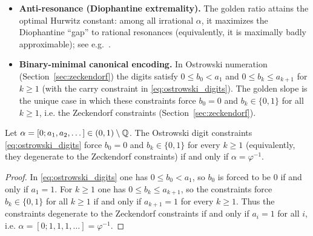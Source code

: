 \begin{itemize}
    \item \textbf{Anti-resonance (Diophantine extremality).} The golden ratio attains the optimal Hurwitz constant: among all irrational $\alpha$, it maximizes the Diophantine ``gap'' to rational resonances (equivalently, it is maximally badly approximable); see e.g.~\cite{Cassels1957,KuipersNiederreiter1974}.
    \item \textbf{Binary-minimal canonical encoding.} In Ostrowski numeration (Section~\ref{sec:zeckendorf}) the digits satisfy $0\le b_0<a_1$ and $0\le b_k\le a_{k+1}$ for $k\ge 1$ (with the carry constraint in \eqref{eq:ostrowski_digits}). The golden slope is the unique case in which these constraints force $b_0=0$ and $b_k\in\{0,1\}$ for all $k\ge 1$, i.e. the Zeckendorf constraints (Section~\ref{sec:zeckendorf}).
\end{itemize}

\begin{proposition}
\label{prop:golden_binary_minimal}
Let $\alpha=[0;a_1,a_2,\dots]\in(0,1)\setminus\mathbb{Q}$. The Ostrowski digit constraints \eqref{eq:ostrowski_digits} force $b_0=0$ and $b_k\in\{0,1\}$ for every $k\ge 1$ (equivalently, they degenerate to the Zeckendorf constraints) if and only if $\alpha=\varphi^{-1}$.
\end{proposition}

\begin{proof}
In \eqref{eq:ostrowski_digits} one has $0\le b_0<a_1$, so $b_0$ is forced to be $0$ if and only if $a_1=1$.
For $k\ge 1$ one has $0\le b_k\le a_{k+1}$, so the constraints force $b_k\in\{0,1\}$ for all $k\ge 1$ if and only if $a_{k+1}=1$ for every $k\ge 1$.
Thus the constraints degenerate to the Zeckendorf constraints if and only if $a_i=1$ for all $i$, i.e. $\alpha=[0;1,1,1,\dots]=\varphi^{-1}$.
\end{proof}

